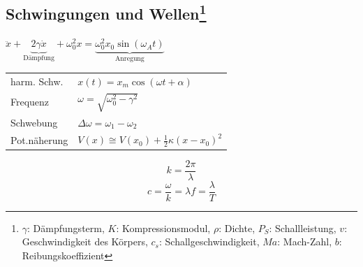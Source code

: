 \documentclass[12pt,a4paper]{article}
\renewcommand{\=}[1]{\stackrel{#1}{=}}
\theoremstyle{definition}
\theoremstyle{remark}
\begin{document}
\subsection[Schwingungen und Wellen]{Schwingungen und Wellen\let\thefootnote\relax\footnote{$\gamma$: Dämpfungsterm, $K$: Kompressionsmodul, $\rho$: Dichte, $P_S$: Schallleistung, $v$: Geschwindigkeit des Körpers, $c_s$: Schallgeschwindigkeit, $Ma$: Mach-Zahl, $b$: Reibungskoeffizient}}

\begin{center}
\begin{minipage}[t]{.5\linewidth}
\vspace{0pt}
$\ddot{x} + \underbrace{2 \gamma \dot{x}}_\text{Dämpfung} + \omega_0^2 x = \underbrace{\omega_0^2 x_0 \sin(\omega_A t)}_\text{Anregung}$\\
\begin{tabular}{ll}
harm. Schw. &  $x(t) = x_m \cos(\omega t + \alpha)$\\
Frequenz & $\omega = \sqrt{\omega_0^2 - \gamma^2}$\\
Schwebung & $\Delta \omega = \omega_1 - \omega_2$\\
Pot.näherung & $V(x) \cong V(x_0) + \frac{1}{2} \kappa (x-x_0)^2$\\
\end{tabular}
\end{minipage}%
\begin{minipage}[t]{.5\linewidth}
\vspace{0pt}
\begin{framed}
$$k = \frac{2 \pi}{\lambda}$$
$$c =  \frac{\omega}{k} = \lambda f = \frac{\lambda}{T}$$
\end{framed}


\end{minipage}
\end{center}
\end{document}
